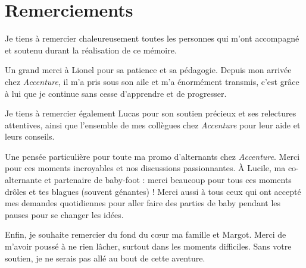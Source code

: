 \chapter*{Remerciements}

Je tiens à remercier chaleureusement toutes les personnes qui m'ont accompagné et soutenu durant la réalisation de ce mémoire.

Un grand merci à Lionel pour sa patience et sa pédagogie. Depuis mon arrivée chez \textit{Accenture}, il m'a pris sous son aile et m'a énormément transmis, c'est grâce à lui que je continue sans cesse d'apprendre et de progresser.

Je tiens à remercier également Lucas pour son soutien précieux et ses relectures attentives, ainsi que l'ensemble de mes collègues chez \textit{Accenture} pour leur aide et leurs conseils.

Une pensée particulière pour toute ma promo d'alternants chez \textit{Accenture}. Merci pour ces moments incroyables et nos discussions passionnantes. À Lucile, ma co-alternante et partenaire de baby-foot : merci beaucoup pour tous ces moments drôles et tes blagues (souvent génantes) ! Merci aussi à tous ceux qui ont accepté mes demandes quotidiennes pour aller faire des parties de baby pendant les pauses pour se changer les idées.

Enfin, je souhaite remercier du fond du cœur ma famille et Margot. Merci de m'avoir poussé à ne rien lâcher, surtout dans les moments difficiles. Sans votre soutien, je ne serais pas allé au bout de cette aventure.